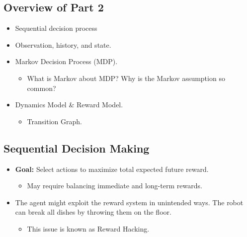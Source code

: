 \subsection{Overview of Part 2}
\begin{summary}
    \begin{itemize}
        \item Sequential decision process
        \item Observation, history, and state.
        \item Markov Decision Process (MDP).
        \begin{itemize}
            \item What is Markov about MDP? Why is the Markov assumption so common?
        \end{itemize}
        \item Dynamics Model \& Reward Model.
        \begin{itemize}
            \item Transition Graph.
        \end{itemize}
    \end{itemize}
\end{summary}

\subsection{Sequential Decision Making}
\begin{definition}
    \begin{itemize}
        \item \textbf{Goal:} Select actions to maximize total expected future reward. 
        \begin{itemize}
            \item May require balancing immediate and long-term rewards.
        \end{itemize}
    \end{itemize}
\end{definition}

\begin{example}
    \begin{itemize}
        \item The agent might exploit the reward system in unintended ways. The robot can break all dishes by throwing them on the floor. 
        \begin{itemize}
            \item This issue is known as Reward Hacking.
        \end{itemize}
    \end{itemize}
\end{example}

